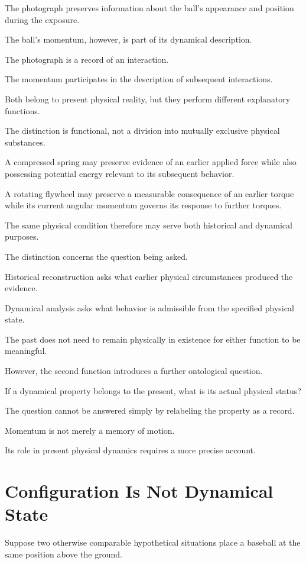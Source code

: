 \documentclass[12pt,onecolumn]{article}
\begin{document}
The photograph preserves information about the ball's appearance and position during the exposure.

The ball's momentum, however, is part of its dynamical description.

The photograph is a record of an interaction.

The momentum participates in the description of subsequent interactions.

Both belong to present physical reality, but they perform different explanatory functions.

The distinction is functional, not a division into mutually exclusive physical substances.

A compressed spring may preserve evidence of an earlier applied force while also possessing potential energy relevant to its subsequent behavior.

A rotating flywheel may preserve a measurable consequence of an earlier torque while its current angular momentum governs its response to further torques.

The same physical condition therefore may serve both historical and dynamical purposes.

The distinction concerns the question being asked.

Historical reconstruction asks what earlier physical circumstances produced the evidence.

Dynamical analysis asks what behavior is admissible from the specified physical state.

The past does not need to remain physically in existence for either function to be meaningful.

However, the second function introduces a further ontological question.

If a dynamical property belongs to the present, what is its actual physical status?

The question cannot be answered simply by relabeling the property as a record.

Momentum is not merely a memory of motion.

Its role in present physical dynamics requires a more precise account.


\section{Configuration Is Not Dynamical State}

Suppose two otherwise comparable hypothetical situations place a baseball at the same position above the ground.
\end{document}

